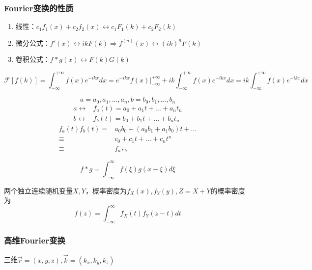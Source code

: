 \subsubsection{Fourier变换的性质}
\begin{enumerate}
    \item 线性：$c_1f_1(x)+c_2f_2(x)\longleftrightarrow c_1F_1(k)+c_2F_2(k)$
    \item 微分公式：$f'(x)\longleftrightarrow ikF(k)\Rightarrow f^{(n)}(x)\longleftrightarrow (ik)^nF(k)$
    \item 卷积公式：$f*g(x)\longleftrightarrow F(k)G(k)$
\end{enumerate}
\begin{prf}[微分公式]
    $$\mathscr{F}[f(k)]=\int_{-\infty}^{+\infty}f(x)e^{-ikx}dx=e^{-ikx}f(x)\bigg|_{-\infty}^{+\infty}+ik\int_{-\infty}^{+\infty}f(x)e^{-ikx}dx=ik\int_{-\infty}^{+\infty}f(x)e^{-ikx}dx$$
\end{prf}
\begin{dfn}[卷积]
    $$a={a_0,a_1,...,a_n},b={b_0,b_1,...,b_n}$$
$$\begin{aligned}
    a\longleftrightarrow&f_a(t)=a_0+a_1t+...+a_nt_n\\
    b\longleftrightarrow&f_b(t)=b_0+b_1t+...+b_nt_n
\end{aligned}$$
$$\begin{aligned}
    f_a(t)f_b(t)=&a_0b_0+(a_0b_1+a_1b_0)t+...\\
    \equiv&c_0+c_1t+...+c_nt^n\\
    \equiv&f_{a*b}
\end{aligned}$$

    $$\boxed{f*g=\int_{-\infty}^{\infty}f(\xi)g(x-\xi)d\xi}$$
\end{dfn}
\begin{ex}[卷积的实际应用]
    两个独立连续随机变量$X,Y$，概率密度为$f_X(x),f_Y(y),Z=X+Y$的概率密度为
$$f(z)=\int_{-\infty}^{\infty}f_X(t)f_Y(z-t)dt$$
\end{ex}

\subsubsection{高维Fourier变换}
三维$\vec{r}=(x,y,z),\vec{k}=(k_x,k_y,k_z)$
$$$$
